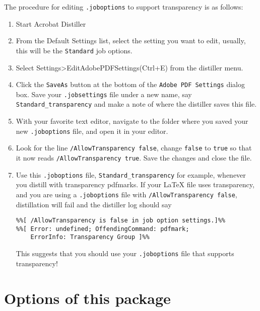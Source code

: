 \documentclass{article}
\begin{document}
\newtopic\noindent
The procedure for editing \texttt{.joboptions} to support transparency is as follows:
\begin{enumerate}
    \item Start Acrobat Distiller

    \item From the Default Settings list, select the setting you want to
        edit, usually, this will be the \texttt{Standard} job options.
    \item Select \textsf{Settings\;>\;Edit\;Adobe\;PDF\;Settings\;(Ctrl+E)}
        from the distiller menu.
    \item Click the \texttt{SaveAs} button at the bottom of the
        \texttt{Adobe PDF Settings} dialog box. Save your
        \texttt{.jobsettings} file under a new name, say
        \texttt{Standard\_transparency} and make a note of where the
        distiller saves this file.
    \item With your favorite text editor, navigate to the folder where you
        saved your new \texttt{.joboptions} file, and open it in your
        editor.
    \item Look for the line \texttt{/AllowTransparency false}, change
        \texttt{false} to \texttt{true} so that it now reads
        \texttt{/AllowTransparency true}. Save the changes and close the
        file.
    \item Use this \texttt{.joboptions} file,
        \texttt{Standard\_transparency} for example, whenever you distill
        with transparency pdfmarks.  If your {\LaTeX} file uses
        transparency, and you are using a \texttt{.joboptions} file with
        \texttt{/AllowTransparency false}, distillation will fail and the
        distiller log should say
\begin{Verbatim}[fontsize=\small]
%%[Error: The Postscript contains Transparency pdfmark, job aborted.]%%
%%[ /AllowTransparency is false in job option settings.]%%
%%[ Error: undefined; OffendingCommand: pdfmark;
    ErrorInfo: Transparency Group ]%%
\end{Verbatim}
This suggests that you should use your \texttt{.joboptions} file that supports transparency!

\end{enumerate}

\section{Options of this package}
\end{document}
